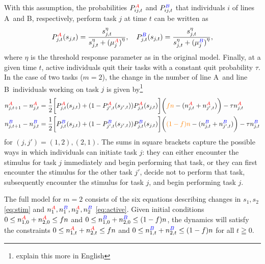 \documentclass[10pt]{article}
\theoremstyle{remark}
\newcommand{\A}{{\color{red}A}}
\newcommand{\B}{{\color{blue}B}}
\begin{document}
With this assumption, the probabilities $P_{ij,t}^{\A}$ and $P_{ij,t}^{\B}$ that individuals $i$ of lines \A\ and \B, respectively, perform task $j$ at time $t$ can be written as
\begin{equation}
    P_{j,t}^{\A} (s_{j,t}) = \frac{s_{j,t}^\eta}{s_{j,t}^\eta + {(\mu_j^{\A})}^\eta}, \quad P_{j,t}^{\B} (s_{j,t}) = \frac{s_{j,t}^\eta}{s_{j,t}^\eta +{(\mu_j^{\B})}^\eta},
\end{equation}
where $\eta$ is the threshold response parameter as in the original model. Finally, at a given time $t$, active individuals quit their tasks with a constant quit probability $\tau$. In the case of two tasks ($m = 2$), the change in the number of line \A\ and line \B\ individuals working on task $j$ is given by\footnote{explain this more in English}
\begin{align}
    n_{j,t+1}^{\A} - n_{j,t}^{\A} & = \frac{1}{2} \bigg[ P_{j,t}^{\A}(s_{j,t}) + (1 - P_{j',t}^{\A}(s_{j',t}))P_{j,t}^{\A}(s_{j,t})\bigg] \bigg( {\color{orange}fn}
 - (n_{j,t}^{\A} + n_{j',t}^{\A}) \bigg) - \tau n_{j,t}^{\A} \nonumber\\
    n_{j,t+1}^{\B} - n_{j,t}^{\B} & = \frac{1}{2} \bigg[ P_{j,t}^{\B}(s_{j,t}) + (1 - P_{j',t}^{\B}(s_{j',t}))P_{j,t}^{\B}(s_{j,t})\bigg] \bigg( {\color{orange}(1-f)n} - (n_{j,t}^{\B} + n_{j',t}^{\B}) \bigg) - \tau n_{j,t}^{\B} \label{eq:active}
\end{align}
for $(j,j')=(1,2), (2,1)$. {\color{black}The sums in square brackets capture the possible ways in which individuals can initiate task $j$: they can either encounter the stimulus for task $j$ immediately and begin performing that task, or they can first encounter the stimulus for the other task $j'$, decide not to perform that task, subsequently encounter the stimulus for task $j$, and begin performing task $j$.}

The full model for $m=2$ consists of the six equations describing changes in $s_1, s_2$ \eqref{eq:stim} and $ n_1^{\A}, n_1^{\B}, n_2^{\A}, n_2^{\B}$ \eqref{eq:active}. Given initial conditions 
$0\leq n_{1,0}^{\A}+n_{2,0}^{\A} \leq fn$ and $0\leq n_{1,0}^{\B}+ n_{2,0}^{\B} \leq (1-f)n$,
the dynamics will satisfy the constraints $0\leq n_{1,t}^{\A}+n_{2,t}^{\A} \leq fn$ and $0\leq n_{1,t}^{\B}+ n_{2,t}^{\B} \leq (1-f)n$ for all $t \geqq 0$.
\end{document}
